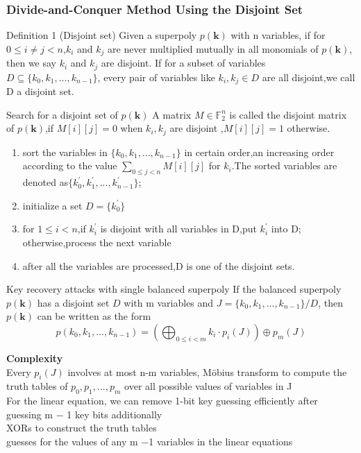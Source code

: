 \documentclass[notheorems,aspectratio=169]{beamer}
\def\bd#1{\boldsymbol{#1}}
\begin{document}
\begin{frame}
    \frametitle{Divide-and-Conquer Method Using the Disjoint Set}
    \begin{block}{Definition 1 (Disjoint set)}
        Given a superpoly $p(\bd{k})$ with n variables, if for $ 0\le i \not =j<n$,$k_i$ and $k_j$ are never multiplied mutually in all monomials
        of $p(\bd{k})$, then we say $k_i$ and $k_j$ are disjoint. If for a subset of variables $D\subseteq \{k_0,k_1,...,k_{n-1}\}$, 
        every pair of variables like $k_i,k_j \in D$ are all disjoint,we call D a disjoint set.
    \end{block}
    Search for a disjoint set of $p(\bd{k})$
        A matrix $M \in \mathbb{F}^n_2$ is called the disjoint matrix of $p(\bd{k})$,if $M[i][j]=0$ when $k_i,k_j$ are disjoint
        ,$M[i][j]=1$ otherwise.
        \begin{enumerate}
            \item sort the variables in $\{k_0,k_1,...,k_{n-1}\}$ in certain order,an increasing
            order according to the value $\sum_{0 \le j <n}M[i][j]$ for $k_i$.The sorted variables are
            denoted as$\{k_0^{\prime},k_1^{\prime},...,k_{n-1}^{\prime}\}$;
            \item initialize a set $D=\{k_0^{\prime}\}$
            \item for $1 \le i<n$,if $k_i^{\prime}$ is disjoint with all variables in D,put $k_i^{\prime}$ into D;
            otherwise,process the next variable
            \item after all the variables are processed,D is one of the disjoint sets.
        \end{enumerate}
    
\end{frame}
\begin{frame}
    
    \begin{block}{Key recovery attacks with single balanced superpoly}
        If the balanced superpoly $p(\bd{k})$ has a disjoint set $D$ with m variables and $J=\{k_0,k_1,...,k_{n-1}\}/D$,
        then $p(\bd{k})$ can be written as the form 
        $$
        p(k_0,k_1,...,k_{n-1})=\left(\bigoplus _{0\le i<m} k_i \cdot p_i(J)\right) \oplus p_m(J)
        $$

    \end{block}
    \textbf {Complexity}\\
    Every $p_i(J)$ involves at most n-m variables, Möbius
    transform to compute the truth tables of $p_0,p_1,...,p_m$ over all possible values of variables in J
    \\ For the linear equation, we can remove 1-bit key
    guessing efficiently after guessing m − 1 key bits additionally\\
     XORs to construct the truth tables\\
     guesses for the values of any m −1 variables in the linear equations
\end{frame}
\end{document}

